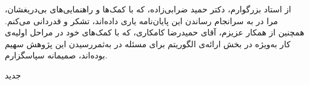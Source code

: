 


\begin{center}
\end{center}

از استاد بزرگوارم، دکتر حمید ضرابی‌زاده، که با کمک‌ها و راهنمایی‌های بی‌دریغشان، مرا
در به سرانجام رساندن این پایان‌نامه یاری داده‌اند، تشکر و قدردانی می‌کنم.
همچنین از همکار عزیزم، آقای حمیدرضا کامکاری، که با کمک‌های خود در مراحل اولیه‌ی کار به‌ویژه در بخش ارائه‌ی الگوریتم برای مسئله در به‌ثمر‌رسیدن این پژوهش سهیم بوده‌اند، صمیمانه سپاسگزارم.

‌جدید
